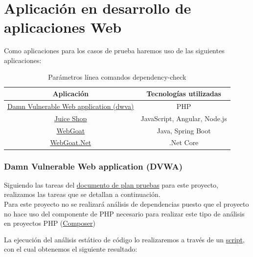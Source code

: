 \section{Aplicación en desarrollo de aplicaciones Web} 

Como aplicaciones para los casos de prueba haremos uso de 
las siguientes aplicaciones:\\
\begin{table}[h!]
    \begin{center}
      \caption{Parámetros línea comandos dependency-check}
      \label{tab:tabla 2}
      \begin{tabular}{c|c}
        \textbf{Aplicación} & \textbf{Tecnologías utilizadas}\\
        \hline
        \href{https://dvwa.co.uk/}{Damn Vulnerable Web application (dwva)} & PHP\\ 
        \href{https://github.com/bkimminich/juice-shop}{Juice Shop} & JavaScript, Angular, Node.js\\
        \href{https://github.com/WebGoat/WebGoat}{WebGoat} &  Java, Spring Boot\\
        \href{https://github.com/tobyash86/WebGoat.NET}{WebGoat.Net} & .Net Core     
      \end{tabular}
    \end{center}
  \end{table}
\newpage

\subsubsection{Damn Vulnerable Web application (DVWA)}
Siguiendo las tareas del \href{https://github.com/M0l1n3ta/PFG/blob/master/Reportes/DVWA/PPR DVWA - Plan Pruebas de Seguridad.docx}{documento de plan pruebas}
para este proyecto, realizamos las tareas que se detallan a continuación.\\

Para este proyecto no se realizará análisis de dependencias puesto que el proyecto no hace uso del componente de PHP 
necesario para realizar este tipo de análisis en proyectos PHP (\href{https://getcomposer.org/}{Composer})

La ejecución del análisis estático de código lo realizaremos a través de un
\href{https://github.com/M0l1n3ta/PFG/blob/master/Scripts/STAT/RunSonarScaner_DWVA.ps1}{script}, con el cual obtenemos 
el siguiente resultado:\\

